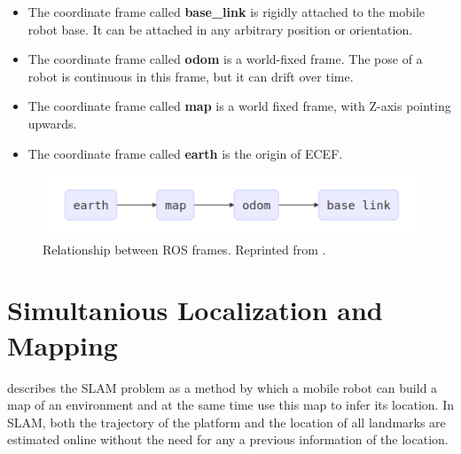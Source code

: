 \begin{itemize}
	\item The coordinate frame called \textbf{base\_link} is rigidly attached to the mobile robot base. It can be attached in any arbitrary position or orientation.
	\item The coordinate frame called \textbf{odom} is a world-fixed frame. The pose of a robot is continuous in this frame, but it can drift over time.
	\item The coordinate frame called \textbf{map} is a world fixed frame, with Z-axis pointing upwards. 
	\item The coordinate frame called \textbf{earth} is the origin of ECEF.
\end{itemize}

\begin{figure}
	\centering
	\includegraphics[width=5in]{figures/ros_rel_frames}
	\caption[Relation between ROS frames]{\small 
	Relationship between ROS frames. Reprinted from . }
	\label{fig:rosrefframes}
\end{figure}

\section{Simultanious Localization and Mapping}

 describes the SLAM problem as a method by which a mobile robot can build a map of an environment and at the same time use this map to infer its location. In SLAM, both the trajectory of the platform and the location of all landmarks are estimated online without the
need for any a previous information of the location.

